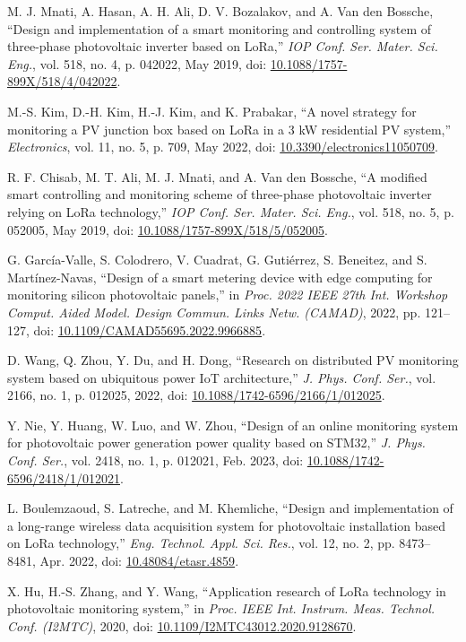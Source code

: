 \documentclass{ieeeaccess}
\begin{document}
\begin{thebibliography}{00}
M. J. Mnati, A. Hasan, A. H. Ali, D. V. Bozalakov, and A. Van den Bossche, “Design and implementation of a smart monitoring and controlling system of three-phase photovoltaic inverter based on LoRa,” \emph{IOP Conf. Ser. Mater. Sci. Eng.}, vol. 518, no. 4, p. 042022, May 2019, doi: \url{10.1088/1757-899X/518/4/042022}.


M.-S. Kim, D.-H. Kim, H.-J. Kim, and K. Prabakar, “A novel strategy for monitoring a PV junction box based on LoRa in a 3 kW residential PV system,” \emph{Electronics}, vol. 11, no. 5, p. 709, May 2022, doi: \url{10.3390/electronics11050709}.

R. F. Chisab, M. T. Ali, M. J. Mnati, and A. Van den Bossche, “A modified smart controlling and monitoring scheme of three-phase photovoltaic inverter relying on LoRa technology,” \emph{IOP Conf. Ser. Mater. Sci. Eng.}, vol. 518, no. 5, p. 052005, May 2019, doi: \url{10.1088/1757-899X/518/5/052005}.

G. García-Valle, S. Colodrero, V. Cuadrat, G. Gutiérrez, S. Beneitez, and S. Martínez-Navas, “Design of a smart metering device with edge computing for monitoring silicon photovoltaic panels,” in \emph{Proc. 2022 IEEE 27th Int. Workshop Comput. Aided Model. Design Commun. Links Netw. (CAMAD)}, 2022, pp. 121–127, doi: \url{10.1109/CAMAD55695.2022.9966885}.

D. Wang, Q. Zhou, Y. Du, and H. Dong, “Research on distributed PV monitoring system based on ubiquitous power IoT architecture,” \emph{J. Phys. Conf. Ser.}, vol. 2166, no. 1, p. 012025, 2022, doi: \url{10.1088/1742-6596/2166/1/012025}.

Y. Nie, Y. Huang, W. Luo, and W. Zhou, “Design of an online monitoring system for photovoltaic power generation power quality based on STM32,” \emph{J. Phys. Conf. Ser.}, vol. 2418, no. 1, p. 012021, Feb. 2023, doi: \url{10.1088/1742-6596/2418/1/012021}.


L. Boulemzaoud, S. Latreche, and M. Khemliche, “Design and implementation of a long-range wireless data acquisition system for photovoltaic installation based on LoRa technology,” \emph{Eng. Technol. Appl. Sci. Res.}, vol. 12, no. 2, pp. 8473–8481, Apr. 2022, doi: \url{10.48084/etasr.4859}.

X. Hu, H.-S. Zhang, and Y. Wang, “Application research of LoRa technology in photovoltaic monitoring system,” in \emph{Proc. IEEE Int. Instrum. Meas. Technol. Conf. (I2MTC)}, 2020, doi: \url{10.1109/I2MTC43012.2020.9128670}.


\end{thebibliography}
\end{document}
